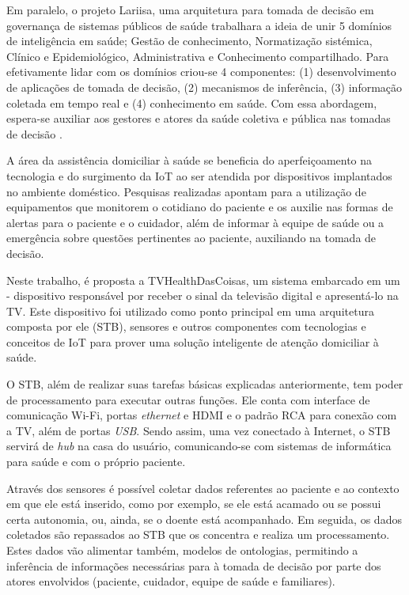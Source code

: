 Em paralelo, o projeto Lariisa, uma arquitetura para tomada de decisão em governança
de sistemas públicos de saúde trabalhara a ideia de unir 5 domínios de inteligência
em saúde; Gestão de conhecimento, Normatização sistémica, Clínico e Epidemiológico,
Administrativa e Conhecimento compartilhado. Para efetivamente lidar com os domínios
criou-se 4 componentes: (1) desenvolvimento de aplicações de tomada de decisão, (2) 
mecanismos de inferência, (3) informação coletada em tempo real e (4) conhecimento em 
saúde. Com essa abordagem, espera-se auxiliar aos gestores e atores da saúde coletiva 
e pública nas tomadas de decisão \cite{oliveira2010context}.

A área da assistência domiciliar à saúde se beneficia do aperfeiçoamento na
tecnologia e do surgimento da IoT ao ser atendida por dispositivos implantados
no ambiente doméstico.  Pesquisas realizadas \cite{triantafyllidis2013,moreira2016} 
apontam para a utilização de equipamentos que monitorem o cotidiano do paciente
e os auxilie nas formas de alertas para o paciente e o cuidador, além de
informar à equipe de saúde ou a emergência sobre questões pertinentes ao
paciente, auxiliando na tomada de decisão.

Neste trabalho, é proposta a TVHealthDasCoisas, um sistema embarcado em um
\stb[] - dispositivo responsável por receber o sinal da  televisão digital e
apresentá-lo na TV. Este dispositivo foi utilizado como ponto principal em uma
arquitetura composta por ele (STB), sensores e outros componentes com
tecnologias e conceitos de IoT para  prover uma solução inteligente de atenção
domiciliar à saúde.

O STB, além de realizar suas tarefas básicas explicadas anteriormente, tem poder
de processamento para executar outras funções. Ele conta com interface de
comunicação Wi-Fi, portas \textit{ethernet} e HDMI e o padrão RCA para
conexão com a TV, além de portas \textit{USB}. Sendo assim, uma vez conectado à
Internet, o STB servirá de \textit{hub} na casa do usuário, comunicando-se
com sistemas de informática para saúde e com o próprio paciente.

Através dos sensores é possível coletar dados referentes ao paciente e ao
contexto em que ele está inserido, como por exemplo, se ele está acamado ou se
possui certa autonomia, ou, ainda, se o doente está acompanhado.  Em seguida, os
dados coletados são repassados ao STB que  os concentra e realiza um
processamento. Estes dados vão alimentar também, modelos de ontologias, 
permitindo a inferência de informações necessárias para à tomada de decisão
por parte dos atores  envolvidos (paciente, cuidador, equipe de saúde e 
familiares). 

